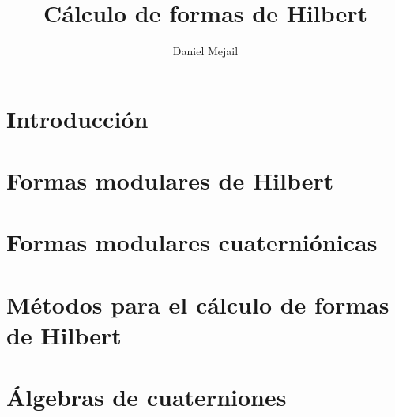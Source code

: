 \documentclass[11pt]{article}
\title{C\'{a}lculo de formas de Hilbert}
\author{Daniel Mejail}
\begin{document}
\maketitle

\section*{Introducci\'{o}n}


\pagebreak


\section{Formas modulares de Hilbert}\label{sec:dehilbert}


\pagebreak

\section{Formas modulares cuaterni\'{o}nicas}\label{sec:cuaternionicas}


\pagebreak

\section{M\'{e}todos para el c\'{a}lculo de formas de Hilbert}\label{sec:metodos}



\pagebreak
\appendix

\section{\'{A}lgebras de cuaterniones}\label{sec:algsdecuaterniones}



\pagebreak
\tableofcontents

\pagebreak
\printindex

\pagebreak
\begin{thebibliography}{99}

\end{thebibliography}
\end{document}
